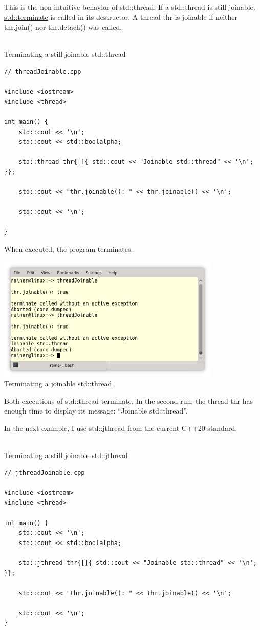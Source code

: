 
This is the non-intuitive behavior of std::thread. If a std::thread is still joinable, \href{https://en.cppreference.com/w/cpp/error/terminate}{std::terminate} is called in its destructor. A thread thr is joinable if neither thr.join() nor thr.detach() was called.

\hspace*{\fill} \\ %
\noindent
Terminating a still joinable std::thread
\begin{lstlisting}[style=styleCXX]
// threadJoinable.cpp

#include <iostream>
#include <thread>

int main() {
	std::cout << '\n';
	std::cout << std::boolalpha;
	
	std::thread thr{[]{ std::cout << "Joinable std::thread" << '\n'; }};
	
	std::cout << "thr.joinable(): " << thr.joinable() << '\n';
	
	std::cout << '\n';
	
}
\end{lstlisting}

When executed, the program terminates.

\begin{center}
\includegraphics[width=0.8\textwidth]{content/3/chapter6/images/25.png}\\
Terminating a joinable std::thread
\end{center}

Both executions of std::thread terminate. In the second run, the thread thr has enough time to display its message: “Joinable std::thread”.

In the next example, I use std::jthread from the current C++20 standard.

\hspace*{\fill} \\ %
\noindent
Terminating a still joinable std::jthread
\begin{lstlisting}[style=styleCXX]
// jthreadJoinable.cpp

#include <iostream>
#include <thread>

int main() {
	std::cout << '\n';
	std::cout << std::boolalpha;
	
	std::jthread thr{[]{ std::cout << "Joinable std::thread" << '\n'; }};
	
	std::cout << "thr.joinable(): " << thr.joinable() << '\n';
	
	std::cout << '\n';
}
\end{lstlisting}

